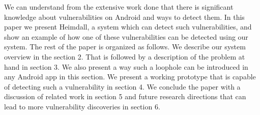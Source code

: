 We can understand from the extensive work done that there is significant knowledge about vulnerabilities on Android and ways to detect them. In this paper we present Heimdall, a system which can detect such vulnerabilities, and show an example of how one of these vulnerabilities can be detected using our system. The rest of the paper is organized as follows. We describe our system overview in the section 2. That is followed by a description of the problem at hand in section 3. We also present a way such a loophole can be introduced in any Android app in this section. We present a working prototype that is capable of detecting such a vulnerability in section 4. We conclude the paper with a discussion of related work in section 5 and future research directions that can lead to more vulnerability discoveries in section 6.


